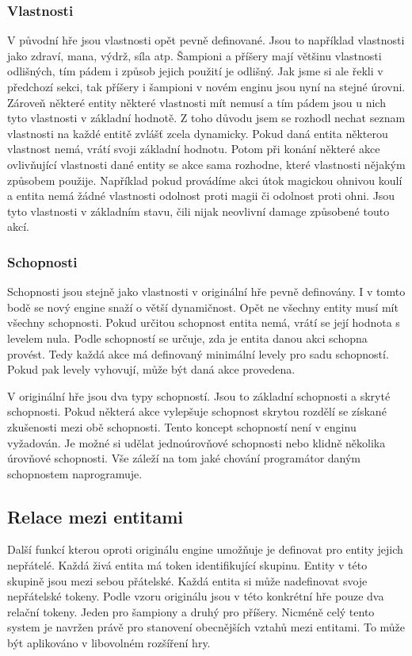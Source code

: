 \subsubsection{Vlastnosti}
V původní hře jsou vlastnosti opět pevně definované. Jsou to například vlastnosti jako zdraví, mana, výdrž, síla atp.
Šampioni a příšery mají většinu vlastnosti odlišných, tím pádem i způsob jejich použití je odlišný. Jak jsme si ale řekli v předchozí sekci,
tak příšery i šampioni v novém enginu jsou nyní na stejné úrovni. Zároveň některé entity některé vlastnosti mít nemusí a tím pádem jsou u nich 
tyto vlastnosti v základní hodnotě. Z toho důvodu jsem se rozhodl nechat seznam vlastnosti na každé entitě zvlášť zcela dynamicky.
Pokud daná entita některou vlastnost nemá, vrátí svoji základní hodnotu. Potom při konání některé akce ovlivňující vlastnosti dané entity se
 akce sama rozhodne, které vlastnosti nějakým způsobem použije. Například pokud provádíme akci útok magickou ohnivou koulí a entita nemá žádné vlastnosti 
 odolnost proti magii či odolnost proti ohni. Jsou tyto vlastnosti v základním stavu, čili nijak neovlivní damage způsobené touto akcí.

 \subsubsection{Schopnosti}
 Schopnosti jsou stejně jako vlastnosti v originální hře pevně definovány. I v tomto bodě se nový engine snaží o větší
 dynamičnost. Opět ne všechny entity musí mít všechny schopnosti. Pokud určitou schopnost entita nemá, vrátí se její hodnota s levelem nula.
 Podle schopností se určuje, zda je entita danou akci schopna provést. Tedy každá akce má definovaný minimální levely pro sadu schopností.
 Pokud pak levely vyhovují, může být daná akce provedena.

 V originální hře jsou dva typy schopností. Jsou to základní schopnosti a skryté schopnosti. Pokud některá akce vylepšuje schopnost skrytou
 rozdělí se získané zkušenosti mezi obě schopnosti. Tento koncept schopností není v enginu vyžadován. Je možné si udělat jednoúrovňové 
 schopnosti nebo klidně několika úrovňové schopnosti. Vše záleží na tom jaké chování programátor daným schopnostem naprogramuje. 

 \subsection{Relace mezi entitami}
 Další funkcí kterou oproti originálu engine umožňuje je definovat pro entity jejich nepřátelé. Každá živá entita má token identifikující
 skupinu. Entity v této skupině jsou mezi sebou přátelské. Každá entita si může nadefinovat svoje nepřátelské tokeny.
 Podle vzoru originálu jsou v této konkrétní hře pouze dva relační tokeny. Jeden pro šampiony a druhý pro příšery. Nicméně
 celý tento system je navržen právě pro stanovení obecnějších vztahů mezi entitami. To může být aplikováno v libovolném rozšíření hry.
 
